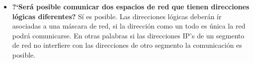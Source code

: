 {\begin{itemize}
        \item \textbf{?`Ser\'a posible comunicar dos espacios de red que tienen direcciones l\'ogicas diferentes?}
            \subitem S\'i es posible. Las direcciones l\'ogicas deber\'an \'ir asociadas a una m\'ascara de red, si la direcci\'on como un todo es 
            \'unica la red podr\'a comunicarse. En otras palabras si las direcciones IP's de un segmento de red no interfiere con las direcciones 
            de otro segmento la comunicaci\'on es posible.
    \end{itemize}
}